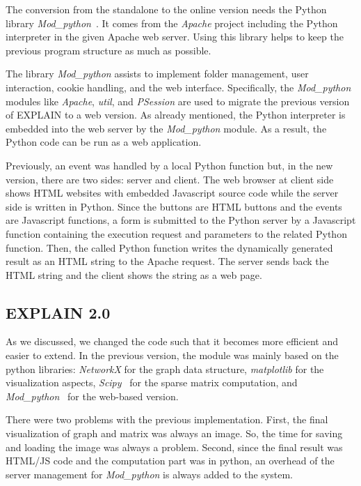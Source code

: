\documentclass[11pt, twoside,a4paper]{book}
\begin{document}
The conversion from the standalone to the online version needs the Python library \textit{Mod\_python}~\cite{modpython2013}. It comes from the \textit{Apache} project including the Python interpreter in the given Apache web server. Using this library helps to keep the previous program structure as much as possible.

The library \textit{Mod\_python} assists to implement folder management, user interaction, cookie handling, and the web interface. Specifically, the \textit{Mod\_python} modules like \textit{Apache}, \textit{util}, and \textit{PSession} are used to migrate the previous version of \mbox{EXPLAIN} to a web version. As already mentioned, the Python interpreter is embedded into the web server by the \textit{Mod\_python} module. As a result, the Python code can be run as a web application.

Previously, an event was handled by a local Python function but, in the new version, there are two sides: server and client. The web browser at client side shows HTML websites with embedded Javascript source code while the server side is written in Python. Since the buttons are HTML buttons and the events are Javascript functions, a form is submitted to the Python server by a Javascript function containing the execution request and parameters to the related Python function. Then, the called Python function writes the dynamically generated result as an HTML string to the Apache request. The server sends back the HTML string and the client shows the string as a web page.

\subsection{EXPLAIN 2.0}
\label{s.impl.explain2}
As we discussed, we changed the code such that it becomes more efficient and easier to extend.
In the previous version, the module was mainly based on the python libraries:
\textit{NetworkX} \cite{networkx2008} for the graph data structure,
\textit{matplotlib} \cite{matplotlib2007} for the visualization aspects,
\textit{Scipy}~\cite{scipy2001} for the sparse matrix computation, and
\textit{Mod\_python}~\cite{modpython2013} for the web-based version.

There were two problems with the previous implementation. First, the final visualization
of graph and matrix was always an image.
So, the time for saving and loading the image was always a problem.
Second, since the final result was HTML/JS code and the computation part was in python,
an overhead of the server management for \textit{Mod\_python} is always added to the system.
\end{document}
